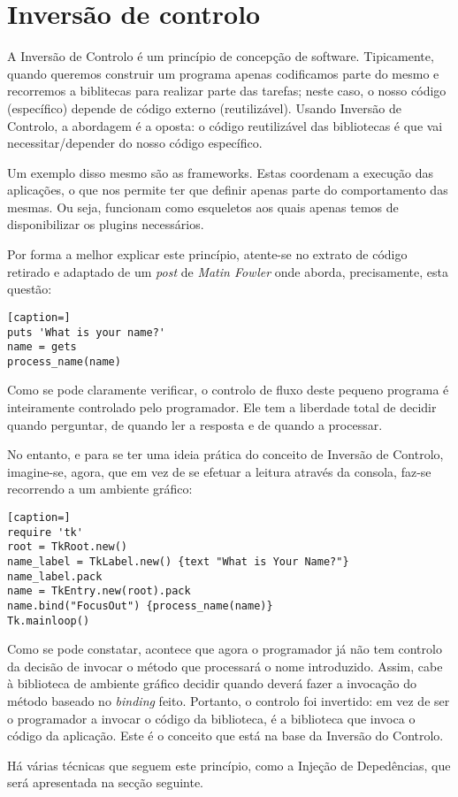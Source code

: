 \section{Inversão de controlo}

A Inversão de Controlo é um princípio de concepção de software. Tipicamente, quando queremos construir um programa apenas codificamos parte do mesmo e recorremos a biblitecas para realizar parte das tarefas; neste caso, o nosso código (específico) depende de código externo (reutilizável). Usando Inversão de Controlo, a abordagem é a oposta: o código reutilizável das bibliotecas é que vai necessitar/depender do nosso código específico.

Um exemplo disso mesmo são as frameworks. Estas coordenam a execução das aplicações, o que nos permite ter que definir apenas parte do comportamento das mesmas. Ou seja, funcionam como esqueletos aos quais apenas temos de disponibilizar os plugins necessários.

Por forma a melhor explicar este princípio, atente-se no extrato de código retirado e adaptado de um \textit{post} de \textit{Matin Fowler} onde aborda, precisamente, esta questão:

\begin{lstlisting}[caption=]
puts 'What is your name?'
name = gets
process_name(name)
\end{lstlisting}

Como se pode claramente verificar, o controlo de fluxo deste pequeno programa é inteiramente controlado pelo programador.
Ele tem a liberdade total de decidir quando perguntar, de quando ler a resposta e de quando a processar.

No entanto, e para se ter uma ideia prática do conceito de Inversão de Controlo, imagine-se, agora, que em vez de se efetuar a leitura através da consola, faz-se recorrendo a um ambiente gráfico:

\begin{lstlisting}[caption=]
require 'tk'
root = TkRoot.new()
name_label = TkLabel.new() {text "What is Your Name?"}
name_label.pack
name = TkEntry.new(root).pack
name.bind("FocusOut") {process_name(name)}
Tk.mainloop()
\end{lstlisting}

Como se pode constatar, acontece que agora o programador já não tem controlo da decisão de invocar o método que processará o nome introduzido.
Assim, cabe à biblioteca de ambiente gráfico decidir quando deverá fazer a invocação do método baseado no \textit{binding} feito.
Portanto, o controlo foi invertido: em vez de ser o programador a invocar o código da biblioteca, é a biblioteca que invoca o código da aplicação.
Este é o conceito que está na base da Inversão do Controlo.

Há várias técnicas que seguem este princípio, como a Injeção de Depedências, que será apresentada na secção seguinte.
